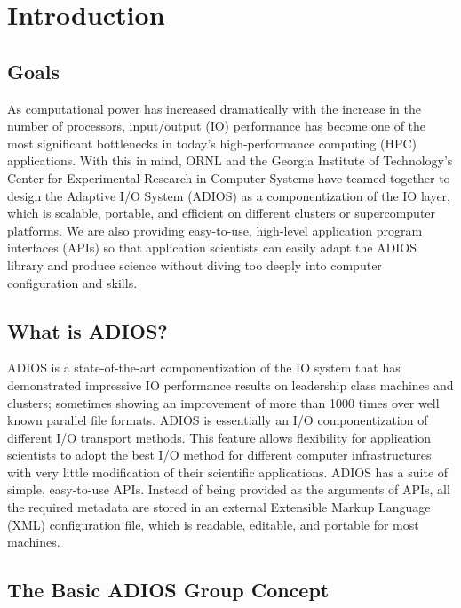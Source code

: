 \chapter{Introduction}

\section{Goals}

As computational power has increased dramatically with the increase in the number
of processors, input/output (IO) performance has become one of the most significant
bottlenecks in today's high-performance computing (HPC) applications. With this
in mind, ORNL and the Georgia Institute of Technology's Center for Experimental
Research in Computer Systems have teamed together to design the Adaptive I/O System
(ADIOS) as a componentization of the IO layer, which is scalable, portable, and
efficient on different clusters or supercomputer platforms. We are also providing
easy-to-use, high-level application program interfaces (APIs) so that application
scientists can easily adapt the ADIOS library and produce science without diving
too deeply into computer configuration and skills.

\section{What is ADIOS?}

{\color{color01} ADIOS is a state-of-the-art componentization of the IO system
that has demonstrated impressive IO performance results on leadership class machines
and clusters; sometimes showing an improvement of more than 1000 times over well
known parallel file formats. }ADIOS is essentially an I/O componentization of different
I/O transport methods. This feature allows flexibility for application scientists
to adopt the best I/O method for different computer infrastructures with very little
modification of their scientific applications. ADIOS has a suite of simple, easy-to-use
APIs. Instead of being provided as the arguments of APIs, all the required metadata
are stored in an external Extensible Markup Language (XML) configuration file,
which is readable, editable, and portable for most machines.

\section{The Basic ADIOS Group Concept}

